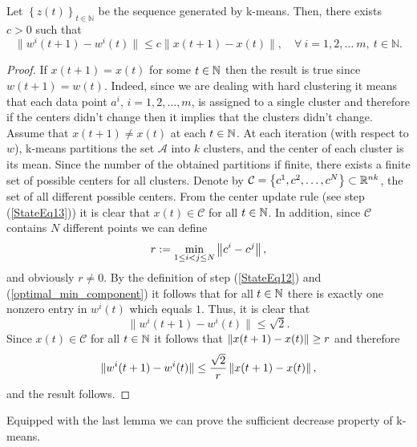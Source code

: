 \begin{lemma} \label{StateLemma_x_bounds_w}
Let $\left\lbrace z(t) \right\rbrace_{t \in \mathbb{N}}$ be the sequence generated by k-means. Then, there exists $c > 0$ such that
\begin{equation*}
	\|w^i(t+1)-w^i(t)\| \leq c \|x(t+1)-x(t)\| , \quad \forall \: i=1,2, \ldots\ m, \: t \in \mathbb{N} .
\end{equation*}
\end{lemma}

\begin{proof}
If $x(t+1)=x(t)$ for some $t \in \mathbb{N}$ then the result is true since $w(t+1)=w(t)$. Indeed, since we are dealing with hard clustering it means that each data point $a^i$, $i=1,2,\ldots,m$, is assigned to a single cluster and therefore if the centers didn't change then it implies that the clusters didn't change. Assume that $x(t+1) \neq x(t)$ at each $t \in \mathbb{N}$. At each iteration (with respect to $w$), k-means partitions the set $\mathcal{A}$ into $k$ clusters, and the center of each cluster is its mean. Since the number of the obtained partitions if finite, there exists a finite set of possible centers for all clusters. Denote by $\mathcal{C} =\left\lbrace c^1,c^2,\ldots,c^N \right\rbrace \subset \mathbb{R}^{nk}$, the set of all different possible centers. From the center update rule (see step (\ref{StateEq13})) it is clear that $x(t)\in \mathcal{C}$ for all $t\in \mathbb{N}$. In addition, since $\mathcal{C}$ contains $N$ different points we can define
\begin{equation*}
	r:=\min\limits_{1 \leq i <j \leq N} \left\Vert {c^i - c^j} \right\Vert,
\end{equation*}
and obviously $r \neq 0$. By the definition of step (\ref{StateEq12})  and (\ref{optimal_min_component}) it follows that for all $t \in \mathbb{N}$ there is exactly one nonzero entry in $w^i(t)$ which equals $1$.
Thus, it is clear that
\begin{equation*}
	\|w^i(t+1)-w^i(t)\| \leq \sqrt{2}.
\end{equation*}
Since $x(t) \in \mathcal{C}$ for all $t \in \mathbb{N}$ it follows that $\left\Vert {x(t+1)-x(t)} \right\Vert \geq r$ and therefore
\begin{equation*}
	\|w^i(t+1)-w^i(t)\| \leq \frac{\sqrt{2}}{r}\left\Vert {x(t+1)-x(t)} \right\Vert,
\end{equation*}
and the result follows.
\end{proof}

Equipped with the last lemma we can prove the sufficient decrease property of k-means.

